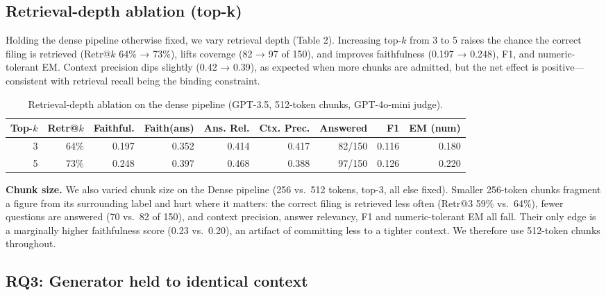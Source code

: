 \documentclass[11pt]{article}
\begin{document}
\hypertarget{retrieval-depth-ablation-top-k}{%
\subsection{Retrieval-depth ablation
(top-k)}\label{retrieval-depth-ablation-top-k}}

Holding the dense pipeline otherwise fixed, we vary retrieval depth
(Table 2). Increasing top-\(k\) from 3 to 5 raises the chance the
correct filing is retrieved (Retr@\(k\) 64\% → 73\%), lifts coverage (82
→ 97 of 150), and improves faithfulness (0.197 → 0.248), F1, and
numeric-tolerant EM. Context precision dips slightly (0.42 → 0.39), as
expected when more chunks are admitted, but the net effect is
positive---consistent with retrieval recall being the binding
constraint.

\begin{table}[t]\centering\small
\begin{tabular}{rrrrrrrrr}
\toprule
Top-$k$ & Retr@$k$ & Faithful. & Faith(ans) & Ans. Rel. & Ctx. Prec. & Answered & F1 & EM (num) \\
\midrule
3 & 64\% & 0.197 & 0.352 & 0.414 & 0.417 & 82/150 & 0.116 & 0.180 \\
5 & 73\% & 0.248 & 0.397 & 0.468 & 0.388 & 97/150 & 0.126 & 0.220 \\
\bottomrule
\end{tabular}
\caption{Retrieval-depth ablation on the dense pipeline (GPT-3.5, 512-token chunks, GPT-4o-mini judge).}
\label{tab:topk}
\end{table}

\textbf{Chunk size.} We also varied chunk size on the Dense pipeline
(256 vs.~512 tokens, top-3, all else fixed). Smaller 256-token chunks
fragment a figure from its surrounding label and hurt where it matters:
the correct filing is retrieved less often (Retr@3 59\% vs.~64\%), fewer
questions are answered (70 vs.~82 of 150), and context precision, answer
relevancy, F1 and numeric-tolerant EM all fall. Their only edge is a
marginally higher faithfulness score (0.23 vs.~0.20), an artifact of
committing less to a tighter context. We therefore use 512-token chunks
throughout.

\hypertarget{rq3-generator-held-to-identical-context}{%
\subsection{RQ3: Generator held to identical
context}\label{rq3-generator-held-to-identical-context}}
\end{document}
